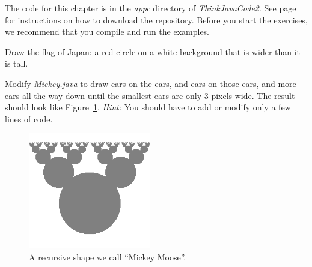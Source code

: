The code for this chapter is in the {\it appc} directory of {\it ThinkJavaCode2}.
See page~\pageref{code} for instructions on how to download the repository.
Before you start the exercises, we recommend that you compile and run the examples.


\begin{exercise}

Draw the flag of Japan: a red circle on a white background that is wider than it is tall.

\end{exercise}


\begin{exercise}

Modify {\it Mickey.java} to draw ears on the ears, and ears on those ears, and more ears all the way down until the smallest ears are only 3 pixels wide.
The result should look like Figure~\ref{fig.moose}.
%
{\em Hint:} You should have to add or modify only a few lines of code.

\begin{figure}[!ht]
\begin{center}
\includegraphics[height=2in]{figs/moose.png}
\caption{A recursive shape we call ``Mickey Moose''.}
\label{fig.moose}
\end{center}
\end{figure}

\end{exercise}


